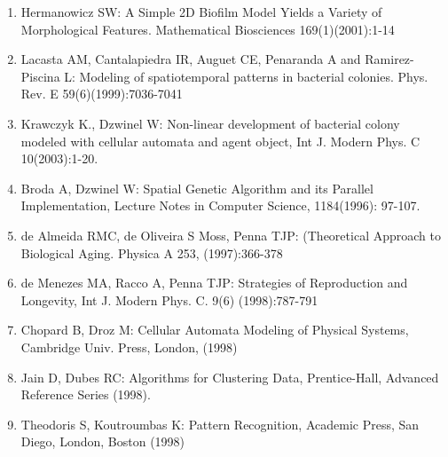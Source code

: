 \documentclass{article}
\begin{document}
\begin{enumerate}
\item Hermanowicz SW: A Simple 2D Biofilm Model Yields a Variety of Morphological Features. Mathematical Biosciences 169(1)(2001):1-14

\item Lacasta AM, Cantalapiedra IR, Auguet CE, Penaranda A and Ramirez-Piscina L: Modeling of spatiotemporal patterns in bacterial colonies. Phys. Rev. E 59(6)(1999):7036-7041

\item Krawczyk K., Dzwinel W: Non-linear development of bacterial colony modeled with cellular automata and agent object, Int J. Modern Phys. C 10(2003):1-20.

\item Broda A, Dzwinel W: Spatial Genetic Algorithm and its Parallel Implementation, Lecture Notes in Computer Science, 1184(1996): 97-107.

\item de Almeida RMC, de Oliveira S Moss, Penna TJP: (Theoretical Approach to Biological Aging. Physica A 253, (1997):366-378

\item de Menezes MA, Racco A, Penna TJP: Strategies of Reproduction and Longevity, Int J. Modern Phys. C. 9(6) (1998):787-791

\item Chopard B, Droz M: Cellular Automata Modeling of Physical Systems, Cambridge Univ. Press, London, (1998)

\item Jain D, Dubes RC: Algorithms for Clustering Data, Prentice-Hall, Advanced Reference Series (1998).

\item Theodoris S, Koutroumbas K: Pattern Recognition, Academic Press, San Diego, London, Boston (1998)
\end{enumerate}

\end{document}
